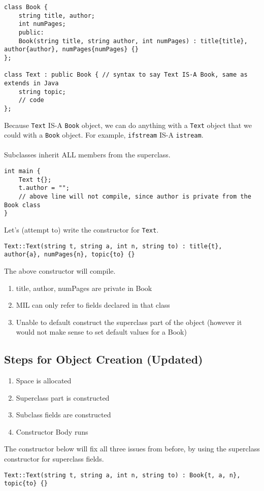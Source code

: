 \documentclass[12pt]{article}
\begin{document}
\begin{lstlisting}
class Book {
    string title, author;
    int numPages;
    public:
    Book(string title, string author, int numPages) : title{title}, author{author}, numPages{numPages} {}
};

class Text : public Book { // syntax to say Text IS-A Book, same as extends in Java
    string topic;
    // code
};
\end{lstlisting}
Because \lstinline{Text} IS-A \lstinline{Book} object, we can do anything with a \lstinline{Text} object that we could with a \lstinline{Book} object. For example, \lstinline{ifstream} IS-A \lstinline{istream}.\\\\Subclasses inherit ALL members from the superclass.
\begin{lstlisting}
int main {
    Text t{};
    t.author = "";
    // above line will not compile, since author is private from the Book class
}
\end{lstlisting}
Let's (attempt to) write the constructor for \lstinline{Text}.
\begin{lstlisting}
Text::Text(string t, string a, int n, string to) : title{t}, author{a}, numPages{n}, topic{to} {}
\end{lstlisting}
The above constructor will compile.
\begin{enumerate}
    \item title, author, numPages are private in Book
    \item MIL can only refer to fields declared in that class
    \item Unable to default construct the superclass part of the object (however it would not make sense to set default values for a Book)
\end{enumerate}

\subsection{Steps for Object Creation (Updated)}
\begin{enumerate}
    \item Space is allocated
    \item Superclass part is constructed
    \item Subclass fields are constructed
    \item Constructor Body runs
\end{enumerate}

\noindent The constructor below will fix all three issues from before, by using the superclass constructor for superclass fields.
\begin{lstlisting}
Text::Text(string t, string a, int n, string to) : Book{t, a, n}, topic{to} {}
\end{lstlisting}
\end{document}
